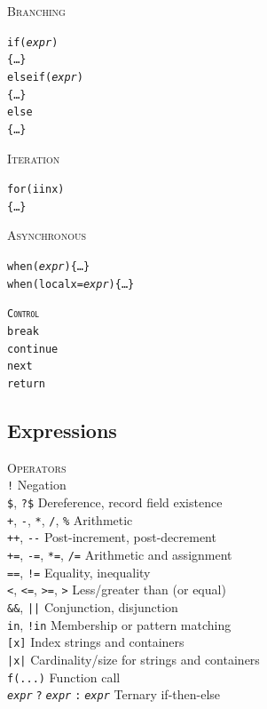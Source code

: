 \documentclass[10pt,landscape]{article}
\newcommand{\minisec}[1]{\textsc{#1}\\}
\begin{document}
\begin{multicols*}{3}
\vspace{-10pt}
\begin{multicols*}{3}
\textsc{Branching}
\begin{alltt}
if (\textit{expr})
    \{ \ldots \}
else if (\textit{expr})
    \{ \ldots \}
else
    \{ \ldots \}
\end{alltt}

\textsc{Iteration}
\begin{alltt}
for (i in x)
    \{ \ldots \}
\end{alltt}

\textsc{Asynchronous}
\begin{alltt}
when (\textit{expr}) \{ \ldots \}
when (local x = \textit{expr}) \{ \ldots \}
\end{alltt}
\vspace{-10pt}

\begin{alltt}
\textsc{Control}\vspace{5pt}
break
continue
next
return
\end{alltt}
\end{multicols*}

\subsection*{Expressions}

\minisec{Operators}
\verb|!| \dotfill Negation\\
\verb|$|, \verb|?$| \dotfill Dereference, record field existence\\
\verb|+|, \verb|-|, \verb|*|, \verb|/|, \verb|%| \dotfill Arithmetic\\
\verb|++|, \verb|--| \dotfill Post-increment, post-decrement\\
\verb|+=|, \verb|-=|, \verb|*=|, \verb|/=| \dotfill Arithmetic and assignment\\
\verb|==|, \verb|!=| \dotfill Equality, inequality\\
\verb|<|, \verb|<=|, \verb|>=|, \verb|>|
  \dotfill Less/greater than (or equal)\\
\verb|&&|, \verb#||# \dotfill Conjunction, disjunction\\
\verb|in|, \verb|!in| \dotfill Membership or pattern matching\\
\verb|[x]| \dotfill Index strings and containers\\
\verb#|x|# \dotfill Cardinality/size for strings and containers\\
\verb|f(...)| \dotfill Function call\\
\texttt{\textit{expr}$\;$?$\;$\textit{expr}$\;$:$\;$\textit{expr}}
  \dotfill Ternary if-then-else


\end{multicols*}
\end{document}
